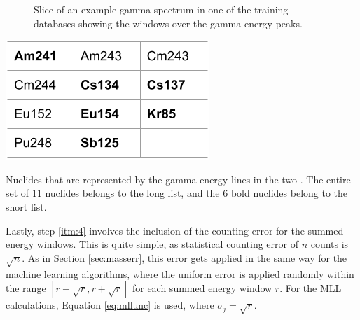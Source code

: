 \begin{figure}[!h]
  \caption{Slice of an example gamma spectrum in one of the training databases
           showing the windows over the gamma energy peaks.}
  \label{fig:enwindows}
\end{figure}



\begin{table}[!h]
  \centering
  \includegraphics[width=0.4\linewidth]{./chapters/method/enlist_nucs.png}
  \caption{Nuclides that are represented by the gamma energy lines in the two . The entire 
           set of 11 nuclides belongs to the long list, and the 6 bold nuclides
           belong to the short list.}
  \label{tbl:enlistnucs}
\end{table}

Lastly, step \ref{itm:4} involves the inclusion of the counting error for the
summed energy windows. This is quite simple, as statistical counting error of
$n$ counts is $\sqrt{n}$.  As in Section \ref{sec:masserr}, this error gets
applied in the same way for the machine learning algorithms, where the uniform
error is applied randomly within the range $[r-\sqrt{r},r+\sqrt{r}]$ for each
summed energy window $r$. For the \gls{MLL} calculations, Equation
\ref{eq:mllunc} is used, where $\sigma_{j} = \sqrt{r}$.  
